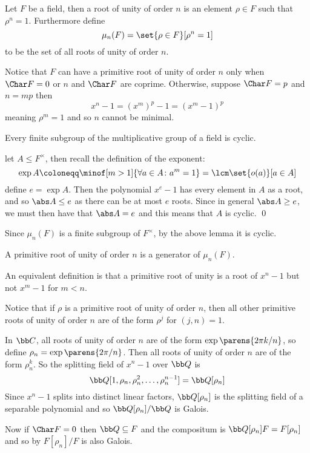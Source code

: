 \bdefn

    Let $F$ be a field, then a {\emphcolor root of unity} of order $n$ is an element $\rho\in F$ such that $\rho^n=1$.
    Furthermore define
    $$ \mu_n(F) = \set{\rho\in F}[\rho^n=1] $$
    to be the set of all roots of unity of order $n$.

\edefn

Notice that $F$ can have a primitive root of unity of order $n$ only when $\Char F=0$ or $n$ and $\Char F$ are coprime.
Otherwise, suppose $\Char F=p$ and $n=mp$ then
$$ x^n - 1 = (x^m)^p - 1 = (x^m - 1)^p $$
meaning $\rho^m=1$ and so $n$ cannot be minimal.

\blemm

    Every finite subgroup of the multiplicative group of a field is cyclic.

\elemm

\Proof let $A\leq F^\times$, then recall the definition of the exponent:
$$ \exp A \coloneqq \minof[m>1]{\forall a\in A\colon a^m=1} = \lcm\set{o(a)}[a\in A] $$
define $e=\exp A$.
Then the polynomial $x^e-1$ has every element in $A$ as a root, and so $\abs A\leq e$ as there can be at most $e$ roots.
Since in general $\abs A\geq e$, we must then have that $\abs A=e$ and this means that $A$ is cyclic.
\qed

Since $\mu_n(F)$ is a finite subgroup of $F^\times$, by the above lemma it is cyclic.

\bdefn

    A {\emphcolor primitive root of unity} of order $n$ is a generator of $\mu_n(F)$.

\edefn

An equivalent definition is that a primitive root of unity is a root of $x^n-1$ but not $x^m-1$ for $m<n$.

Notice that if $\rho$ is a primitive root of unity of order $n$, then all other primitive roots of unity of order $n$ are of the form $\rho^j$ for $(j,n)=1$.

In ${\bb C}$, all roots of unity of order $n$ are of the form $\exp\parens{2\pi k/n}$, so define $\rho_n=\exp\parens{2\pi/n}$.
Then all roots of unity of order $n$ are of the form $\rho_n^k$.
So the splitting field of $x^n-1$ over ${\bb Q}$ is
$$ {\bb Q}[1,\rho_n,\rho_n^2,\dots,\rho_n^{n-1}] = {\bb Q}[\rho_n] $$
Since $x^n-1$ splits into distinct linear factors, ${\bb Q}[\rho_n]$ is the splitting field of a separable polynomial and so ${\bb Q}[\rho_n]/{\bb Q}$ is Galois.

Now if $\Char F=0$ then ${\bb Q}\subseteq F$ and the compositum is ${\bb Q}[\rho_n]F=F[\rho_n]$ and so by  $F[\rho_n]/F$ is also Galois.

